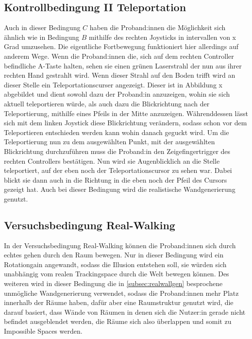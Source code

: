         \subsection{Kontrollbedingung II Teleportation}\label{subsec:teleport}
            Auch in dieser Bedingung $C$ haben die Proband:innen die Möglichkeit sich ähnlich wie in Bedingung $B$ mithilfe des rechten Joysticks in intervallen von x Grad%
            umzusehen. Die eigentliche Fortbewegung funktioniert hier allerdings auf anderem Wege. Wenn die Proband:innen die, sich auf dem rechten Controller befindliche
            A-Taste halten, sehen sie einen grünen Laserstrahl der nun aus ihrer rechten Hand gestrahlt wird.
            Wenn dieser Strahl auf den Boden trifft wird an dieser Stelle ein Teleportationscurser angezeigt. Dieser ist in Abbildung x %
            abgebildet und dient sowohl dazu der Proband:in anzuzeigen, wohin sie sich aktuell teleportieren würde, als auch dazu die Blickrichtung nach der Teleportierung, mithilfe eines Pfeils in der Mitte anzuzeigen. Währenddessen lässt sich mit dem linken Joystick diese Blickrichtung verändern, sodass schon vor dem Teleportieren entschieden werden kann wohin danach geguckt wird. Um die Teleportierung nun zu dem ausgewählten Punkt, mit der ausgewählten Blickrichtung durchzuführen muss die Proband:in den Zeigefingertrigger des rechten Controllers bestätigen.
            Nun wird sie Augenblicklich an die Stelle teleportiert, auf der eben noch der Teleportationscursor zu sehen war. Dabei blickt sie dann auch in die Richtung in die eben noch der Pfeil des Cursors gezeigt hat.
            Auch bei dieser Bedingung wird die realistische Wandgenerierung genutzt.


        \subsection{Versuchsbedingung Real-Walking}\label{subsec:realwalk}
            In der Versuchsbedingung Real-Walking können die Proband:innen sich durch echtes gehen durch den Raum bewegen. Nur in dieser Bedingung wird ein Rotationgain angewandt, sodass die Illusion entstehen soll, sie würden sich unabhängig vom realen Trackingspace durch die Welt bewegen können.
            Des weiteren wird in dieser Bedingung die in \autoref{subsec:realwallgen} besprochene unmögliche Wandgenerierung verwendet, sodass die Proband:innen mehr Platz innerhalb der Räume haben, dafür aber eine Raumstruktur genutzt wird, die darauf basiert, dass Wände von Räumen in denen sich die Nutzer:in gerade nicht befindet ausgeblendet werden, die Räume sich also überlappen und somit zu Impossible Spaces werden.

